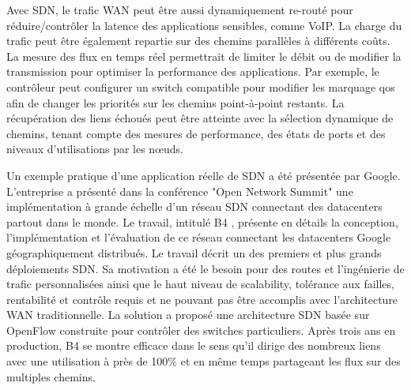 Avec SDN, le trafic WAN peut être aussi dynamiquement re-routé pour réduire/contrôler la latence des applications sensibles, comme VoIP. La charge du trafic peut être également repartie sur des chemins parallèles à différents coûts.
La mesure des flux en temps réel permettrait de limiter le débit ou de modifier la transmission pour optimiser la performance des applications. Par exemple, le contrôleur peut configurer un switch compatible pour modifier les marquage \gls{qos} afin de changer les priorités sur les chemins point-à-point restants.
La récupération des liens échoués peut être atteinte avec la sélection dynamique de chemins, tenant compte des mesures de performance, des états de ports et des niveaux d'utilisations par les nœuds.

Un exemple pratique d'une application réelle de SDN a été présentée par Google. L'entreprise a présenté dans la conférence "Open Network Summit" \cite{googleONS} une implémentation à grande échelle d'un réseau SDN connectant des \glspl{datacenter} partout dans le monde. Le travail, intitulé B4 \cite{SDNWANB4}, présente en détails la conception, l'implémentation et l'évaluation de ce réseau connectant les \glspl{datacenter} Google géographiquement distribués. 
Le travail décrit un des premiers et plus grands déploiements SDN. Sa motivation a été le besoin pour des routes et l'ingénierie de trafic personnalisées ainsi que le haut niveau de \gls{scalability}, tolérance aux failles, rentabilité et contrôle requis et ne pouvant pas être accomplis avec l'architecture WAN traditionnelle. La solution a proposé une architecture SDN basée sur OpenFlow construite pour contrôler des switches particuliers. Après trois ans en production, B4 se montre efficace dans le sens qu'il dirige des nombreux liens avec une utilisation à près de 100\% et en même temps partageant les flux sur des multiples chemins. \cite{SurveySDNApplications}


